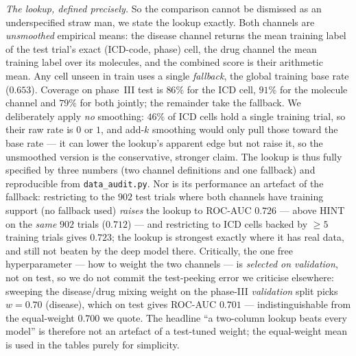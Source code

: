 \documentclass[a4paper,fleqn]{cas-sc}
\begin{document}
\emph{The lookup, defined precisely.} So the comparison cannot be dismissed as an underspecified
straw man, we state the lookup exactly. Both channels are \emph{unsmoothed} empirical means: the
disease channel returns the mean training label of the test trial's exact (ICD-code, phase) cell,
the drug channel the mean training label over its molecules, and the combined score is their
arithmetic mean. Any cell unseen in train uses a single \emph{fallback}, the global training base
rate ($0.653$). Coverage on phase~III test is $86\%$ for the ICD cell, $91\%$ for the molecule
channel and $79\%$ for both jointly; the remainder take the fallback. We deliberately apply
\emph{no} smoothing: $46\%$ of ICD cells hold a single training trial, so their raw rate is $0$ or
$1$, and add-$k$ smoothing would only pull those toward the base rate --- it can lower the lookup's
apparent edge but not raise it, so the unsmoothed version is the conservative, stronger claim.
The lookup is thus fully specified by three numbers (two channel definitions and one fallback) and
reproducible from \texttt{data\_audit.py}. Nor is its performance an artefact of the fallback:
restricting to the $902$ test trials where both channels have training support (no fallback used)
\emph{raises} the lookup to ROC-AUC $0.726$ --- above HINT on the \emph{same} $902$ trials
($0.712$) --- and restricting to ICD cells backed by $\ge5$ training trials gives $0.723$; the
lookup is strongest exactly where it has real data, and still not beaten by the deep model there. Critically, the one free hyperparameter --- how to weight
the two channels --- is \emph{selected on validation}, not on test, so we do not commit the
test-peeking error we criticise elsewhere: sweeping the disease/drug mixing weight on the phase-III
\emph{validation} split picks $w{=}0.70$ (disease), which on test gives ROC-AUC $0.701$ ---
indistinguishable from the equal-weight $0.700$ we quote. The headline ``a two-column lookup beats
every model'' is therefore not an artefact of a test-tuned weight; the equal-weight mean is used in
the tables purely for simplicity.
\end{document}

